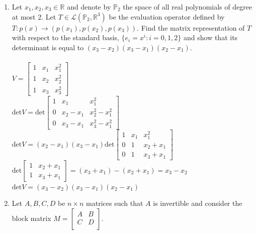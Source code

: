 \documentclass{article}
\begin{document}
{{\begin{enumerate}
\newpage\item Let $x_1,x_2,x_3\in\mathbb{R}$ and denote by $\mathbb{P}_2$ the space of all real polynomials of degree at most 2. Let $T\in\mathcal{L}(\mathbb{P}_2,\mathbb{R}^3)$ be the evaluation operator defined by $T:p(x)\rightarrow (p(x_1),p(x_2),p(x_3))$. Find the matrix representation of $T$ with respect to the standard basis, $\{e_i=x^i:i=0,1,2\}$ and show that its determinant is equal to $(x_3-x_2)(x_3-x_1)(x_2-x_1)$. 
\\
\\$V=\left[\begin{array}{ccc}1 & x_1 & x_1^2\\1 & x_2 & x_2^2\\1 & x_3 & x_3^2\end{array}\right]$
\\$\textrm{det}V=\textrm{det}\left[\begin{array}{ccc}1&x_1&x_1^2\\0&x_2-x_1&x_2^2-x_1^2\\0&x_3-x_1&x_3^2-x_1^2\end{array}\right]$
\\$\textrm{det}V=(x_2-x_1)(x_3-x_1)\textrm{det}\left[\begin{array}{ccc}1&x_1&x_1^2\\0&1&x_2+x_1\\0&1&x_3+x_1\end{array}\right]$
\\$\textrm{det}\left[\begin{array}{cc}1 & x_2+x_1\\1&x_3+x_1\end{array}\right]=(x_3+x_1)-(x_2+x_1)=x_3-x_2$
\\$\textrm{det}V=(x_3-x_2)(x_3-x_1)(x_2-x_1)$

\newpage\item Let $A,B,C,D$ be $n\times n$ matrices such that $A$ is invertible and consider the block matrix 
$M=\left[
\begin{array}{cc}
A & B\\
C & D\\
\end{array}\right]$.


\end{enumerate}}}
\end{document}
